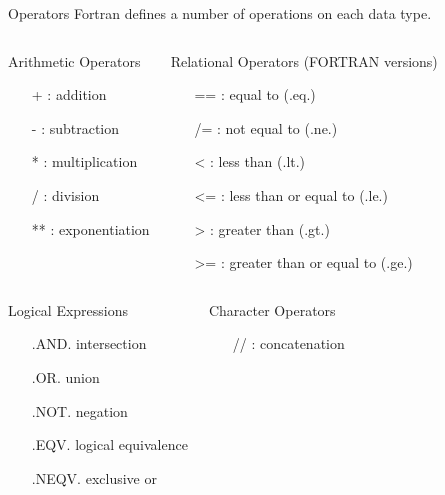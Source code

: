 \documentclass[10pt,t]{beamer}
\begin{document}
\begin{frame}{Operators}
  Fortran defines a number of operations on each data type.
  \begin{columns}[t]
    \begin{eblock}{\scriptsize Arithmetic Operators}
      \begin{itemize}
        \footnotesize
        \item[+]: addition
        \item[-]: subtraction
        \item[*]: multiplication
        \item[/]: division
        \item[**]: exponentiation
      \end{itemize}
    \end{eblock}
    \begin{eblock}{\scriptsize Relational Operators (FORTRAN versions)}
      \begin{itemize}
        \footnotesize
        \item[==]: equal to (.eq.)
        \item[/=]: not equal to (.ne.)
        \item[<]: less than (.lt.)
        \item[<=]: less than or equal to (.le.)
        \item[>]: greater than (.gt.)
        \item[>=]: greater than or equal to (.ge.)
      \end{itemize}
    \end{eblock}
  \end{columns}
  \begin{columns}[t]
    \begin{eblock}{\scriptsize Logical Expressions}
      \begin{itemize}
        \footnotesize
        \item[]{\color{lubrown}.AND.} intersection
        \item[]{\color{lubrown}.OR.} union
        \item[]{\color{lubrown}.NOT.} negation
        \item[]{\color{lubrown}.EQV.} logical equivalence
        \item[]{\color{lubrown}.NEQV.} exclusive or
      \end{itemize}
    \end{eblock}
    \begin{eblock}{\scriptsize Character Operators}
      \begin{itemize}
        \footnotesize
        \item[//]: concatenation
      \end{itemize}
    \end{eblock}
  \end{columns}
\end{frame}
\end{document}

